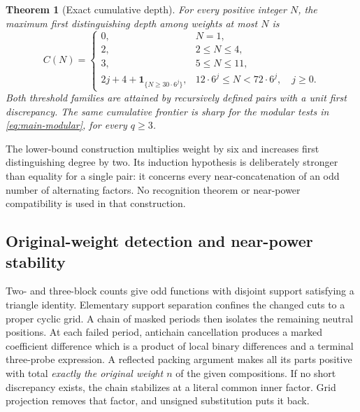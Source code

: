 \documentclass[11pt,a4paper]{amsart}
\numberwithin{equation}{section}
\theoremstyle{plain}
\newtheorem{theorem}{Theorem}[section]
\theoremstyle{definition}
\newcommand{\ind}{\mathbf1}
\begin{document}
\begin{theorem}[Exact cumulative depth]\label{thm:main-depth}
For every positive integer \(N\), the maximum first distinguishing depth among weights at most \(N\) is
\begin{equation}\label{eq:frontier}
C(N)=
\begin{cases}
0,&N=1,\\
2,&2\le N\le4,\\
3,&5\le N\le11,\\
2j+4+\ind_{\{N\ge30\cdot6^j\}},
 &12\cdot6^j\le N<72\cdot6^j,\quad j\ge0.
\end{cases}
\end{equation}
Both threshold families are attained by recursively defined pairs with a
unit first discrepancy.  The same cumulative frontier is sharp for the
modular tests in \eqref{eq:main-modular}, for every \(q\ge3\).
\end{theorem}

The lower-bound construction multiplies weight by six and increases first
distinguishing degree by two.  Its induction hypothesis is deliberately
stronger than equality for a single pair: it concerns every near-concatenation
of an odd number of alternating factors.  No recognition theorem or
near-power compatibility is used in that construction.

\subsection{Original-weight detection and near-power stability}
Two- and three-block counts give odd functions with disjoint support
satisfying a triangle identity.  Elementary support separation confines the
changed cuts to a proper cyclic grid.  A chain of masked periods then isolates
the remaining neutral positions.  At each failed period, antichain
cancellation produces a marked coefficient difference which is a product
of local binary differences and a terminal three-probe expression.
A reflected packing argument makes all its parts positive with total
\emph{exactly the original weight \(n\)} of the given compositions.  If no short discrepancy exists,
the chain stabilizes at a literal common inner factor.  Grid projection
removes that factor, and unsigned substitution puts it back.
\end{document}
